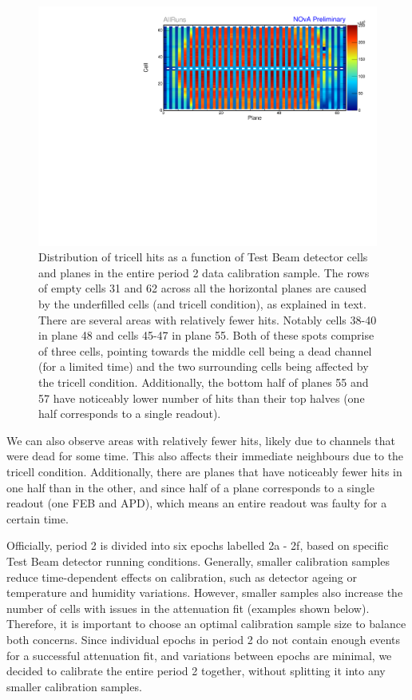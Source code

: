 \begin{figure}[h]
\centering
\includegraphics[width=\textwidth]{Plots/TBCalibration/Attenprofs_P2Data_CellPlane_AllRuns.pdf}
\caption[Plane-Cell distribution of tricell hits for period 2 data]{Distribution of tricell hits as a function of Test Beam detector cells and planes in the entire period 2 data calibration sample. The rows of empty cells 31 and 62 across all the horizontal planes are caused by the underfilled cells (and tricell condition), as explained in text. There are several areas with relatively fewer hits. Notably cells 38-40 in plane 48 and cells 45-47 in plane 55. Both of these spots comprise of three cells, pointing towards the middle cell being a dead channel (for a limited time) and the two surrounding cells being affected by the tricell condition. Additionally, the bottom half of planes 55 and 57 have noticeably lower number of hits than their top halves (one half corresponds to a single readout).}
\label{fig:CalibhistMap_period2}
\end{figure}

We can also observe areas with relatively fewer hits, likely due to channels that were dead for some time. This also affects their immediate neighbours due to the tricell condition. Additionally, there are planes that have noticeably fewer hits in one half than in the other, and since half of a plane corresponds to a single readout (one \gls{FEB} and \gls{APD}), which means an entire readout was faulty for a certain time.

Officially, period 2 is divided into six epochs labelled 2a - 2f, based on specific Test Beam detector running conditions. Generally, smaller calibration samples reduce time-dependent effects on calibration, such as detector ageing or temperature and humidity variations. However, smaller samples also increase the number of cells with issues in the attenuation fit (examples shown below). Therefore, it is important to choose an optimal calibration sample size to balance both concerns. Since individual epochs in period 2 do not contain enough events for a successful attenuation fit, and variations between epochs are minimal, we decided to calibrate the entire period 2 together, without splitting it into any smaller calibration samples.

